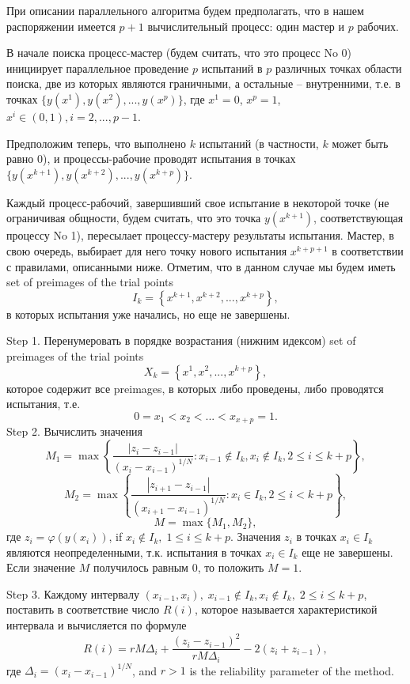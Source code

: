 \documentclass{svproc}
\begin{document}
При описании параллельного алгоритма будем предполагать, что в нашем распоряжении имеется $p+1$ вычислительный процесс: один мастер и $p$ рабочих.
 
В начале поиска процесс-мастер (будем считать, что это процесс No 0) инициирует параллельное проведение $p$ испытаний в $p$ различных точках области поиска, две из которых являются граничными, а остальные -- внутренними, т.е. в точках $\{y(x^1), y(x^2), ...,y(x^p)\}$, где $x^1 = 0$, $x^p = 1$, $x^i\in(0,1), i=2,..., p-1$.

Предположим теперь, что выполнено $k$ испытаний (в частности, $k$ может быть равно 0), и процессы-рабочие проводят испытания в точках $\{y(x^{k+1}), y(x^{k+2}), ...,y(x^{k+p})\}$. 

Каждый процесс-рабочий, завершивший свое испытание в некоторой точке (не ограничивая общности, будем считать, что это точка $y(x^{k+1})$, соответствующая процессу No 1), пересылает процессу-мастеру результаты испытания. Мастер, в свою очередь, выбирает для него точку нового испытания $x^{k+p+1}$ в соответствии с правилами, описанными ниже.
Отметим, что в данном случае мы будем иметь set of preimages of the trial points
\[
I_k = \left\{ x^{k+1},x^{k+2},...,x^{k+p} \right\},
\]
в которых испытания уже начались, но еще не завершены.

Step 1. Перенумеровать в порядке возрастания (нижним идексом) set of preimages of the trial points 
\[
X_k = \left\{x^1, x^2,...,x^{k+p} \right\},
\]
которое содержит все preimages, в которых либо проведены, либо проводятся испытания, т.е.
\[
0=x_1<x_2<...<x_{x+p}=1.
\]
Step 2. Вычислить значения 
\[
M_1=\max \left\{ \frac{ \left|z_i - z_{i-1} \right|}{(x_i-x_{i-1})^{1/N}} : x_{i-1} \notin I_k, x_i \notin I_k, 2\leq i\leq k+p \right\},
\]
\[
M_2=\max \left\{ \frac{ \left|z_{i+1} - z_{i-1} \right|}{(x_{i+1}-x_{i-1})^{1/N}} : x_i \in I_k, 2\leq i < k+p \right\},
\]
\[
M=\max\{M_1,M_2\},
\]
где $z_i=\varphi(y(x_i))$, if $x_i \notin I_k, \; 1\leq i \leq k+p$. Значения $z_i$ в точках $x_i \in I_k$ являются неопределенными, т.к. испытания в точках $x_i \in I_k$ еще не завершены. Если значение $M$ получилось равным 0, то положить $M=1$.

Step 3. Каждому интервалу $(x_{i-1},x_i), \; x_{i-1} \notin I_k, x_i \notin I_k, \; 2\leq i\leq k+p$, поставить в соответствие число $R(i)$, которое называется характеристикой интервала и вычисляется по формуле
\[
R(i)=rM\Delta_i+\frac{(z_i-z_{i-1})^2}{rM\Delta_i}-2(z_i+z_{i-1}),
\]
где $\Delta_i=\left(x_i-x_{i-1}\right)^{1/N}$, and $r>1$ is the reliability parameter of the method.
\end{document}
